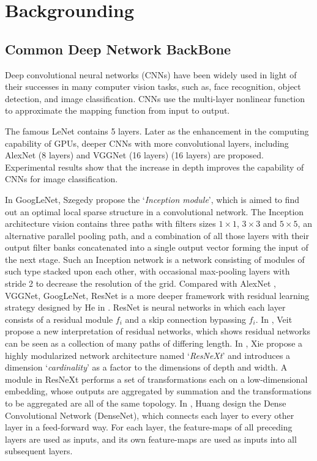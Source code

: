 \section{Backgrounding}


\subsection{Common Deep Network BackBone}
Deep convolutional neural networks (CNNs) \cite{Lecun2014Backpropagation} have been widely used in light of their successes in many computer vision tasks, such as, face recognition\cite{Schroff2015FaceNet},  object detection\cite{Ren2015Faster}, and image classification\cite{Krizhevsky2012ImageNet}. CNNs use the multi-layer nonlinear function to approximate the mapping function from input to output.

The famous LeNet contains 5 layers. Later as the enhancement in the computing capability of GPUs, deeper CNNs with more convolutional layers, including AlexNet (8 layers) \cite{Krizhevsky2012ImageNet} and VGGNet (16 layers) (16 layers)\cite{Simonyan-VGG} are proposed. Experimental results show that the increase in depth improves the capability of CNNs for image classification.

In GoogLeNet\cite{Szegedy-GoogLeNet}, Szegedy \etal propose the `\emph{Inception module}', which is aimed to find out an optimal local sparse structure in a convolutional network. The Inception architecture vision contains three paths with filters sizes $1 \times 1$, $3 \times 3$ and $5\times 5$, an alternative parallel pooling path, and a combination of all those layers with their output filter banks concatenated into a single output vector forming the input of the next stage.
Such an Inception network is a network consisting of modules of such type stacked upon each other, with occasional max-pooling layers with stride 2 to decrease the resolution of the grid.
Compared with AlexNet \cite{Krizhevsky2012ImageNet}, VGGNet\cite{Simonyan-VGG}, GoogLeNet\cite{Szegedy-GoogLeNet}, ResNet is a more deeper framework with residual learning strategy designed by He \etal in \cite{He-Resnet}. ResNet is neural networks in which each layer consists of a residual module $f_i$ and a skip connection bypassing $f_i$.
In \cite{veit2016residual}, Veit \etal propose a new interpretation of residual networks, which shows residual networks can be seen as a collection of many paths of differing length.
In \cite{xie2017aggregated}, Xie \etal propose a highly modularized network architecture named `\emph{ResNeXt}' and introduces a dimension `\emph{cardinality}' as a factor to the dimensions of depth and width. A module in ResNeXt performs a set of transformations each on a low-dimensional embedding, whose outputs are aggregated by summation and the transformations to be aggregated are all of the same topology.
In \cite{huang2016densely}, Huang \etal design the Dense Convolutional Network (DenseNet), which connects each layer
to every other layer in a feed-forward way. For each layer, the feature-maps of all preceding layers are used as inputs, and its own feature-maps are used as inputs into all subsequent layers.

